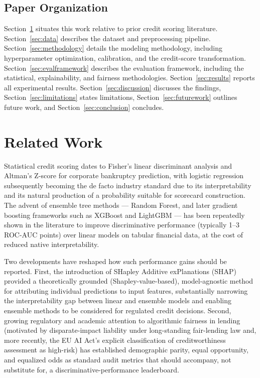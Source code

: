 \documentclass[journal]{IEEEtran}
\begin{document}
\subsection{Paper Organization}

Section~\ref{sec:related} situates this work relative to prior credit scoring literature. Section~\ref{sec:data} describes the dataset and preprocessing pipeline. Section~\ref{sec:methodology} details the modeling methodology, including hyperparameter optimization, calibration, and the credit-score transformation. Section~\ref{sec:evalframework} describes the evaluation framework, including the statistical, explainability, and fairness methodologies. Section~\ref{sec:results} reports all experimental results. Section~\ref{sec:discussion} discusses the findings, Section~\ref{sec:limitations} states limitations, Section~\ref{sec:futurework} outlines future work, and Section~\ref{sec:conclusion} concludes.

\section{Related Work}
\label{sec:related}

Statistical credit scoring dates to Fisher's linear discriminant analysis and Altman's Z-score for corporate bankruptcy prediction, with logistic regression subsequently becoming the de facto industry standard due to its interpretability and its natural production of a probability suitable for scorecard construction. The advent of ensemble tree methods --- Random Forest, and later gradient boosting frameworks such as XGBoost and LightGBM --- has been repeatedly shown in the literature to improve discriminative performance (typically 1--3 ROC-AUC points) over linear models on tabular financial data, at the cost of reduced native interpretability.

Two developments have reshaped how such performance gains should be reported. First, the introduction of SHapley Additive exPlanations (SHAP) provided a theoretically grounded (Shapley-value-based), model-agnostic method for attributing individual predictions to input features, substantially narrowing the interpretability gap between linear and ensemble models and enabling ensemble methods to be considered for regulated credit decisions. Second, growing regulatory and academic attention to algorithmic fairness in lending (motivated by disparate-impact liability under long-standing fair-lending law and, more recently, the EU AI Act's explicit classification of creditworthiness assessment as high-risk) has established demographic parity, equal opportunity, and equalized odds as standard audit metrics that should accompany, not substitute for, a discriminative-performance leaderboard.
\end{document}
